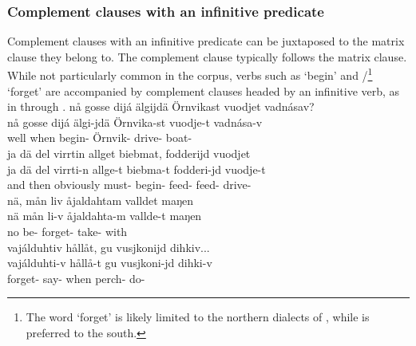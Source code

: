 \subsubsection{Complement clauses with an infinitive predicate}\label{infinitiveComplementClauses}
Complement clauses with an infinitive predicate can be juxtaposed to the matrix clause they belong to. The complement clause typically follows the matrix clause. 
While not particularly common in the corpus, verbs such as  ‘begin’ and /\footnote{The word  ‘forget’ is likely limited to the northern dialects of \PS, while  is preferred to the south.} 
‘forget’ %
are accompanied by complement clauses headed by an infinitive verb, as in  through .
\ea\label{complClauseJuxInf1}
\glll	nå gosse dijá älgijdä Örnvikast vuodjet vadnásav?\\
	nå gosse dijá älgi-jdä Örnvika-st vuodje-t vadnása-v\\
	well when  begin- Örnvik- drive- boat-\\\nopagebreak
{} 
\z
\ea\label{complClauseJuxInf2}
\glll	ja dä del virrtin allget biebmat, fodderijd vuodjet\\
	ja dä del virrti-n allge-t biebma-t fodderi-jd vuodje-t\\
	and then obviously must- begin- feed- feed- drive-\\\nopagebreak
{} 
\z
\ea\label{complClauseJuxInf3}%
\glll	nä, mån liv åjaldahtam valldet maŋen\\
	nä mån li-v åjaldahta-m vallde-t maŋen\\
	no  be- forget- take- with\\\nopagebreak
{} 
\z
\ea\label{complClauseJuxInf4}%
\glll	vajálduhtiv hållåt, gu vusjkonijd dihkiv...\\
	vajálduhti-v hållå-t gu vusjkoni-jd dihki-v\\
	forget- say- when perch- do-\\\nopagebreak
{} 
\z



